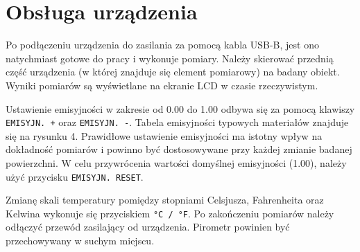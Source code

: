 
\section*{Obsługa urządzenia}
Po podłączeniu urządzenia do zasilania za pomocą kabla USB-B, jest ono natychmiast gotowe do pracy i wykonuje pomiary. Należy skierować przednią część urządzenia (w której znajduje się element pomiarowy) na badany obiekt. Wyniki pomiarów są wyświetlane na ekranie LCD w czasie rzeczywistym.

\vspace{12pt}

Ustawienie emisyjności w zakresie od 0.00 do 1.00 odbywa się za pomocą klawiszy \texttt{EMISYJN. +} oraz \texttt{EMISYJN. -}. Tabela emisyjności typowych materiałów znajduje się na rysunku 4. Prawidłowe ustawienie emisyjności ma istotny wpływ na dokładność pomiarów i powinno być dostosowywane przy każdej zmianie badanej powierzchni. W celu przywrócenia wartości domyślnej emisyjności (1.00), należy użyć przycisku \texttt{EMISYJN. RESET}.

\vspace{12pt}

Zmianę skali temperatury pomiędzy stopniami Celsjusza, Fahrenheita oraz Kelwina wykonuje się przyciskiem \texttt{°C / °F}. Po zakończeniu pomiarów należy odłączyć przewód zasilający od urządzenia. Pirometr powinien być przechowywany w suchym miejscu.






